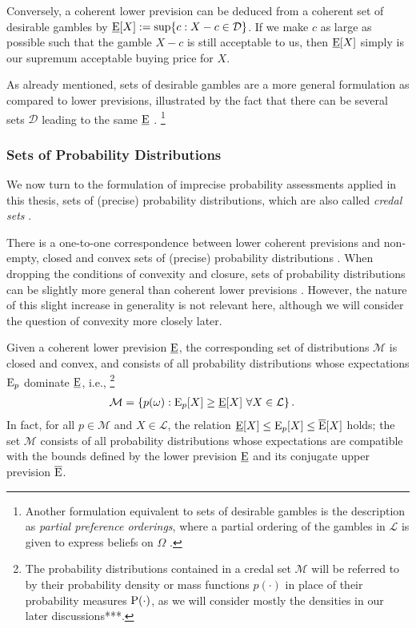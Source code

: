 Conversely, a coherent lower prevision can be deduced from a coherent set of desirable gambles by
$\underline{\operatorname{E}}[X] := \sup\{c: X - c \in \mathcal{D}\}$.
If we make $c$ as large as possible such that the gamble $X-c$ is still acceptable to us,
then $\underline{\operatorname{E}}[X]$ simply is our supremum acceptable buying price for $X$.

As already mentioned, sets of desirable gambles are a more general formulation
as compared to lower previsions, illustrated by the fact that there can be
several sets $\mathcal{D}$ leading to the same $\underline{\operatorname{E}}$ \parencite[p.~139]{2000:walley::towards}.%
\footnote{Another formulation equivalent to sets of desirable gambles is the description as \emph{partial preference orderings},
where a partial ordering of the gambles in $\mathcal{L}$ is given to express beliefs on $\Omega$
\parencite[p.~138]{2000:walley::towards}.}

\subsubsection{Sets of Probability Distributions}

We now turn to the formulation of imprecise probability assessments
applied in this thesis, 
sets of (precise) probability distributions,
which are also called \emph{credal sets} \parencite[e.g.,][p.~136]{2000:walley::towards}.

There is a one-to-one correspondence between lower coherent previsions
and non-empty, closed and convex sets of (precise) probability distributions
\parencite[\S 3.6.1]{1991:walley}.
When dropping the conditions of convexity and closure,
sets of probability distributions can be slightly more general
than coherent lower previsions \parencite[\S 5]{2000:walley::towards}.
However, the nature of this slight increase in generality is not relevant here,
although we will consider the question of convexity more closely later.

Given a coherent lower prevision $\underline{\operatorname{E}}$,
the corresponding set of distributions $\mathcal{M}$
is closed and convex, and consists of all probability distributions
whose expectations $\operatorname{E}_p$ dominate $\underline{\operatorname{E}}$, i.e.,%
\footnote{The probability distributions contained in a credal set $\mathcal{M}$
will be referred to by their probability density or mass functions $p(\cdot)$
in place of their probability measures $\operatorname{P}(\cdot)$, as we will consider mostly the densities
in our later discussions***.}
\begin{align*}
\mathcal{M} &= \{ p(\omega) : \operatorname{E}_p[X] \ge \underline{\operatorname{E}}[X]\ \forall X \in \mathcal{L}\}\,.
\end{align*}
In fact, for all $p \in \mathcal{M}$ and $X \in \mathcal{L}$,
the relation $\underline{\operatorname{E}}[X] \le \operatorname{E}_p[X] \le \overline{\operatorname{E}}[X]$ holds;
the set $\mathcal{M}$ consists of all probability distributions
whose expectations are compatible with the bounds defined by
the lower prevision $\underline{\operatorname{E}}$ and its conjugate upper prevision $\overline{\operatorname{E}}$.

